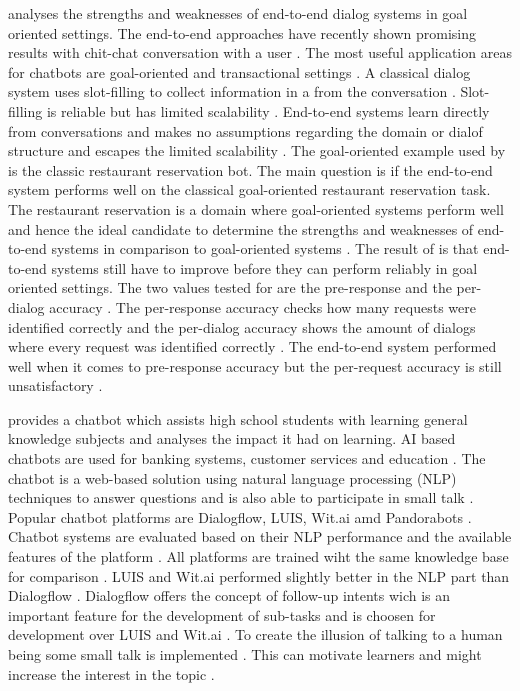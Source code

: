 \documentclass[12pt, backref]{report}
\begin{document}
\citet{bordes2016learning} analyses the strengths and weaknesses of end-to-end dialog systems in goal oriented settings.
The end-to-end approaches have recently shown promising results with chit-chat conversation with a user \cite{bordes2016learning}.
The most useful application areas for chatbots are goal-oriented and transactional settings \cite{bordes2016learning}.
A classical dialog system uses slot-filling to collect information in a from the conversation \cite{bordes2016learning}.
Slot-filling is reliable but has limited scalability \cite{bordes2016learning}.
End-to-end systems learn directly from conversations and makes no assumptions regarding the domain or dialof structure and escapes the limited scalability \cite{bordes2016learning}. 
The goal-oriented example used by \citet{bordes2016learning} is the classic restaurant reservation bot.
The main question is if the end-to-end system performs well on the classical goal-oriented restaurant reservation task.
The restaurant reservation is a domain where goal-oriented systems perform well and hence the ideal candidate to determine the strengths and weaknesses of end-to-end systems in comparison to goal-oriented systems \cite{bordes2016learning}.
The result of \citet{bordes2016learning} is that end-to-end systems still have to improve before they can perform reliably in goal oriented settings. The two values tested for are the pre-response and the per-dialog accuracy \cite{bordes2016learning}.
The per-response accuracy checks how many requests were identified correctly and the per-dialog accuracy shows the amount of dialogs where every request was identified correctly \cite{bordes2016learning}. The end-to-end system performed well when it comes to pre-response accuracy but the per-request accuracy is still unsatisfactory \cite{bordes2016learning}.

\citet{dutta2017developing} provides a chatbot which assists high school students with learning general knowledge subjects and analyses the impact it had on learning.
AI based chatbots are used for banking systems, customer services and education \cite{dutta2017developing}.
The chatbot is a web-based solution using natural language processing (NLP) techniques to answer questions and is also able to participate in small talk \cite{dutta2017developing}.
Popular chatbot platforms are Dialogflow, LUIS, Wit.ai amd Pandorabots \cite{dutta2017developing}.
Chatbot systems are evaluated based on their NLP performance and the available features of the platform \cite{dutta2017developing}. All platforms are trained wiht the same knowledge base for comparison \cite{dutta2017developing}. LUIS and Wit.ai performed slightly better in the NLP part than Dialogflow \cite{dutta2017developing}.
Dialogflow offers the concept of follow-up intents wich is an important feature for the development of sub-tasks and is choosen for development over LUIS and Wit.ai \cite{dutta2017developing}.
To create the illusion of talking to a human being some small talk is implemented \cite{dutta2017developing}. This can motivate learners and might increase the interest in the topic \cite{dutta2017developing}.
\end{document}
